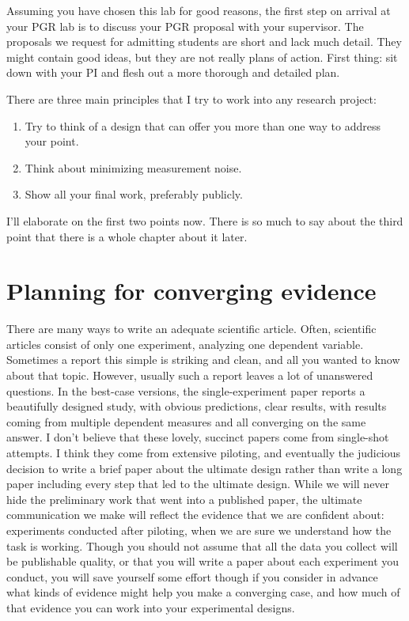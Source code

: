 \documentclass[12pt,]{book}
\theoremstyle{definition}
\theoremstyle{definition}
\theoremstyle{definition}
\theoremstyle{remark}
\begin{document}
Assuming you have chosen this lab for good reasons, the first step on
arrival at your PGR lab is to discuss your PGR proposal with your
supervisor. The proposals we request for admitting students are short
and lack much detail. They might contain good ideas, but they are not
really plans of action. First thing: sit down with your PI and flesh out
a more thorough and detailed plan.

There are three main principles that I try to work into any research
project:

\begin{enumerate}
\def\labelenumi{\arabic{enumi}.}
\item
  Try to think of a design that can offer you more than one way to
  address your point.
\item
  Think about minimizing measurement noise.
\item
  Show all your final work, preferably publicly.
\end{enumerate}

I'll elaborate on the first two points now. There is so much to say
about the third point that there is a whole chapter about it later.

\section{Planning for converging
evidence}\label{planning-for-converging-evidence}

There are many ways to write an adequate scientific article. Often,
scientific articles consist of only one experiment, analyzing one
dependent variable. Sometimes a report this simple is striking and
clean, and all you wanted to know about that topic. However, usually
such a report leaves a lot of unanswered questions. In the best-case
versions, the single-experiment paper reports a beautifully designed
study, with obvious predictions, clear results, with results coming from
multiple dependent measures and all converging on the same answer. I
don't believe that these lovely, succinct papers come from single-shot
attempts. I think they come from extensive piloting, and eventually the
judicious decision to write a brief paper about the ultimate design
rather than write a long paper including every step that led to the
ultimate design. While we will never hide the preliminary work that went
into a published paper, the ultimate communication we make will reflect
the evidence that we are confident about: experiments conducted after
piloting, when we are sure we understand how the task is working. Though
you should not assume that all the data you collect will be publishable
quality, or that you will write a paper about each experiment you
conduct, you will save yourself some effort though if you consider in
advance what kinds of evidence might help you make a converging case,
and how much of that evidence you can work into your experimental
designs.
\end{document}
